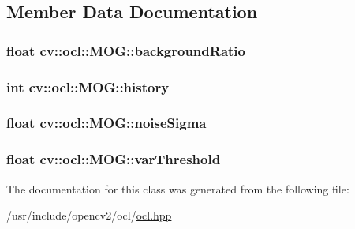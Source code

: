 \subsection{Member Data Documentation}
\hypertarget{classcv_1_1ocl_1_1MOG_ad70652a47c37fe012a9f6789729a8e42}{
\subsubsection[{background\-Ratio}]{\setlength{\rightskip}{0pt plus 5cm}float cv\-::ocl\-::\-M\-O\-G\-::background\-Ratio}}\label{classcv_1_1ocl_1_1MOG_ad70652a47c37fe012a9f6789729a8e42}
\hypertarget{classcv_1_1ocl_1_1MOG_a9577630863c64d082769278e35df9c9f}{
\subsubsection[{history}]{\setlength{\rightskip}{0pt plus 5cm}int cv\-::ocl\-::\-M\-O\-G\-::history}}\label{classcv_1_1ocl_1_1MOG_a9577630863c64d082769278e35df9c9f}
\hypertarget{classcv_1_1ocl_1_1MOG_a60c52e20b306cce50e1e23bbc356431a}{
\subsubsection[{noise\-Sigma}]{\setlength{\rightskip}{0pt plus 5cm}float cv\-::ocl\-::\-M\-O\-G\-::noise\-Sigma}}\label{classcv_1_1ocl_1_1MOG_a60c52e20b306cce50e1e23bbc356431a}
\hypertarget{classcv_1_1ocl_1_1MOG_a598c0e1d23f892c93fa45185b1d940cc}{
\subsubsection[{var\-Threshold}]{\setlength{\rightskip}{0pt plus 5cm}float cv\-::ocl\-::\-M\-O\-G\-::var\-Threshold}}\label{classcv_1_1ocl_1_1MOG_a598c0e1d23f892c93fa45185b1d940cc}


The documentation for this class was generated from the following file\-:\begin{DoxyCompactItemize}
\item 
/usr/include/opencv2/ocl/\hyperlink{ocl_2ocl_8hpp}{ocl.\-hpp}\end{DoxyCompactItemize}
